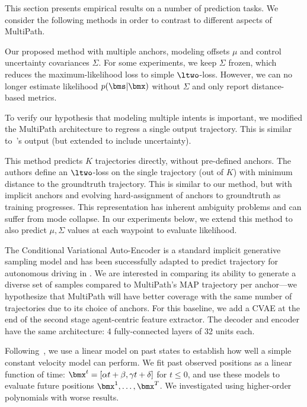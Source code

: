 \documentclass{article}
\newcommand{\multiflow}{MultiPath\xspace}
\begin{document}
This section presents empirical results on a number of prediction tasks. We consider the following methods in order to contrast to different aspects of \multiflow.

\PAR{\multiflow $\mu$ [, $\Sigma$].} Our proposed method with multiple anchors, modeling offsets $\mu$ and control uncertainty covariances $\Sigma$. For some experiments, we keep $\Sigma$ frozen, which reduces the maximum-likelihood loss to simple $\ltwo$-loss. However, we can no longer estimate likelihood $p(\bms|\bmx)$ without $\Sigma$ and only report distance-based metrics. 

 To verify our hypothesis that modeling multiple intents is important, we modified the \multiflow architecture to regress a single output trajectory. This is similar to~\cite{Luo18}'s output (but extended to include uncertainty).

 This method predicts $K$ trajectories directly, without pre-defined anchors. The authors define an $\ltwo$-loss on the single trajectory (out of $K$) with minimum distance to the groundtruth trajectory. This is similar to our method, but with implicit anchors and evolving hard-assignment of anchors to groundtruth as training progresses. This representation has inherent ambiguity problems and can suffer from mode collapse. In our experiments below, we extend this method to also predict $\mu, \Sigma$ values at each waypoint to evaluate likelihood.

 The Conditional Variational Auto-Encoder is a standard implicit generative sampling model and has been successfully adapted to predict trajectory for autonomous driving in \cite{Lee17}. We are interested in comparing its ability to generate a diverse set of samples compared to \multiflow's MAP trajectory per anchor---we hypothesize that \multiflow will have better coverage with the same number of trajectories due to its choice of anchors. For this baseline, we add a CVAE at the end of the second stage agent-centric feature extractor. The decoder and encoder have the same architecture: 4 fully-connected layers of 32 units each.

 Following~\cite{Becker18}, we use a linear model on past states to establish how well a simple constant velocity model can perform.  We fit past observed positions as a linear function of time: $\bmx^t = [\alpha t + \beta, \gamma t + \delta]$ for $t \leq 0$, and use these models to evaluate future positions $\bmx^1, \ldots, \bmx^T$.  We investigated using higher-order polynomials with worse results.
\end{document}
